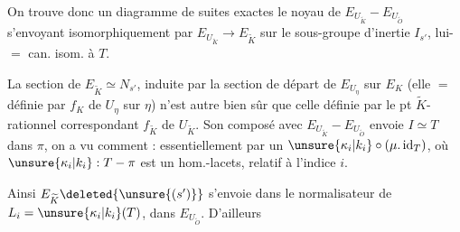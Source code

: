On trouve donc un diagramme de suites exactes
le noyau  de $E_{U_{\widetilde K}}-E_{U_{\widetilde O}}$ s'envoyant isomorphiquement par $E_{U_{\widetilde K}}\longrightarrow E_{\widetilde K}$ sur le sous-groupe d'inertie $I_{s'}$, lui-$=$ can. isom. à $T$.

La section de  $E_{\widetilde K}\simeq N_{s'}$, induite par la section de départ de $E_{U_\eta}$ sur $E_K$ (elle $=$ définie par  $f_K$ de $U_\eta$ sur $\eta$) n'est autre bien sûr que celle définie par le pt $\widetilde K$-rationnel correspondant $f_{\widetilde K}$ de $U_{\widetilde K}$. Son composé avec $E_{U_{\widetilde K}}-E_{U_{\widetilde O}}$ envoie $I\simeq T$ dans $\pi$, on a vu comment : essentiellement par un $\unsure{\kappa_i|k_i}\circ(\mu.\operatorname{id}_T)$, où $\unsure{\kappa_i|k_i}:T-\pi$ est un hom.-lacets, relatif à l'indice $i$.

Ainsi  $E_{\widetilde K}\deleted{\unsure{(s')}}$ s'envoie dans le normalisateur de $L_i=\unsure{\kappa_i|k_i}(T)$, dans $E_{U_{\widetilde O}}$. D'ailleurs
